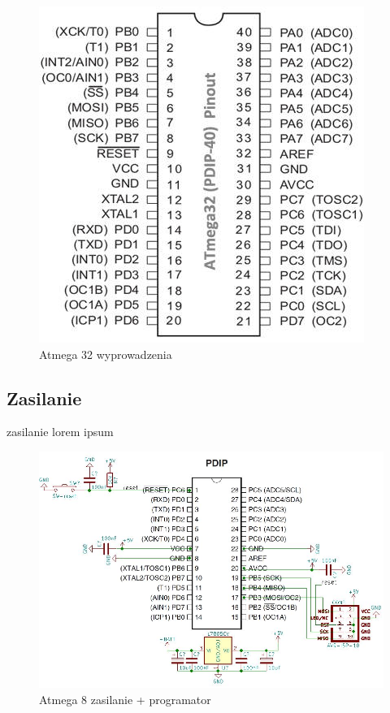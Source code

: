 \documentclass{article}
\begin{document}
\begin{figure}[H]
	\center
	\includegraphics[width=\textwidth]{img/atmega32-pinout.jpg}
	\caption{Atmega 32 wyprowadzenia}
	\label{fig:img2}
\end{figure}

\subsection{Zasilanie}
zasilanie lorem ipsum

\begin{figure}[H]
	\center
	\includegraphics[width=\textwidth]{img/atmega-zasilanie.jpg}
	\caption{Atmega 8 zasilanie + programator}
	\label{fig:img3}
\end{figure}
\end{document}
